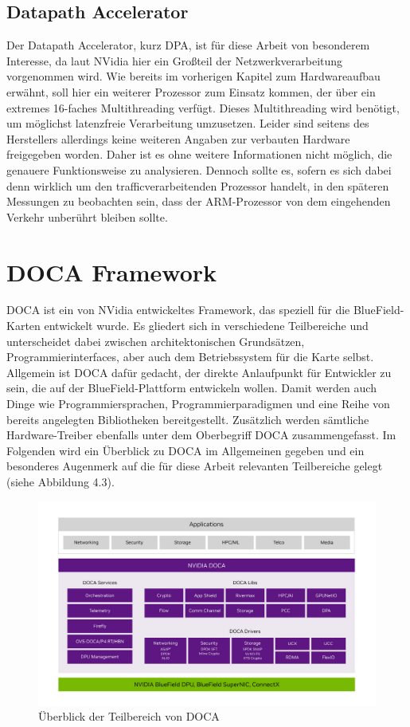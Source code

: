 \subsection{Datapath Accelerator}
Der Datapath Accelerator, kurz DPA, ist für diese Arbeit von besonderem Interesse, da laut NVidia hier ein Großteil der Netzwerkverarbeitung vorgenommen wird. Wie bereits im vorherigen Kapitel zum Hardwareaufbau erwähnt, soll hier ein weiterer Prozessor zum Einsatz kommen, der über ein extremes 16-faches Multithreading verfügt. Dieses Multithreading wird benötigt, um möglichst latenzfreie Verarbeitung umzusetzen. \cite{nvidia_dpa_subsystem_2025} Leider sind seitens des Herstellers allerdings keine weiteren Angaben zur verbauten Hardware freigegeben worden. Daher ist es ohne weitere Informationen nicht möglich, die genauere Funktionsweise zu analysieren. Dennoch sollte es, sofern es sich dabei denn wirklich um den trafficverarbeitenden Prozessor handelt, in den späteren Messungen zu beobachten sein, dass der ARM-Prozessor von dem eingehenden Verkehr unberührt bleiben sollte.

\section{DOCA Framework}
DOCA ist ein von NVidia entwickeltes Framework, das speziell für die BlueField-Karten entwickelt wurde. Es gliedert sich in verschiedene Teilbereiche und unterscheidet dabei zwischen architektonischen Grundsätzen, Programmierinterfaces, aber auch dem Betriebssystem für die Karte selbst. Allgemein ist DOCA dafür gedacht, der direkte Anlaufpunkt für Entwickler zu sein, die auf der BlueField-Plattform entwickeln wollen. Damit werden auch Dinge wie Programmiersprachen, Programmierparadigmen und eine Reihe von bereits angelegten Bibliotheken bereitgestellt. Zusätzlich werden sämtliche Hardware-Treiber ebenfalls unter dem Oberbegriff DOCA zusammengefasst. \cite{nvidia_doca_framework} Im Folgenden wird ein Überblick zu DOCA im Allgemeinen gegeben und ein besonderes Augenmerk auf die für diese Arbeit relevanten Teilbereiche gelegt  (siehe Abbildung 4.3).
\begin{figure}
    \centering
    \includegraphics[width=1\linewidth]{images/Screenshot 2025-04-26 at 08-31-41 DOCA Overview - NVIDIA Docs.png}
    \caption{Überblick der Teilbereich von DOCA}
    \label{fig:enter-label}
\end{figure}
